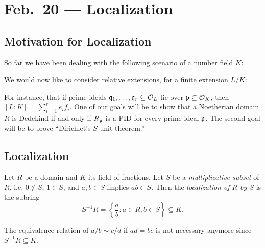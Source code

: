 \chapter{Feb.~20 --- Localization}

\section{Motivation for Localization}

\begin{remark}
So far we have been dealing with the following
scenario of a number field $K$:
\begin{center}
\end{center}
We would now like to consider relative extensions,
for a finite extension $L / K$:
\begin{center}
\end{center}
For instance, that if prime ideals $\mathfrak{q}_1, \dots, \mathfrak{q}_r \subseteq \mathcal{O}_L$ lie
over $\mathfrak{p} \subseteq \mathcal{O}_K$, then $[L : K] = \sum_{i = 1}^r e_i f_i$.
One of our goals will be to show that a Noetherian
domain $R$ is Dedekind if and only if $R_{\mathfrak{p}}$ is a
PID for every prime ideal $\mathfrak{p}$.
The second goal will be to prove
``Dirichlet's $S$-unit theorem.''
\end{remark}

\section{Localization}

\begin{definition}
  Let $R$ be a domain and $K$ its field of fractions.
  Let $S$ be a \emph{multiplicative subset} of $R$,
  i.e. $0 \notin S$, $1 \in S$, and
  $a, b \in S$ implies $ab \in S$. Then the
  \emph{localization of $R$ by $S$} is the subring
  \[
    S^{-1} R = \left\{ \frac{a}{b} : a \in R, b \in S \right\} \subseteq K.
  \]
\end{definition}

\begin{remark}
  The equivalence relation of $a / b \sim c / d$
  if $ad = bc$ is not necessary anymore since
  $S^{-1} R \subseteq K$.
\end{remark}

